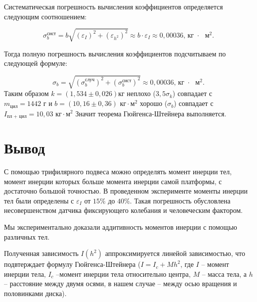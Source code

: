 \documentclass[a4paper,14pt]{extarticle}
\begin{document}
	Систематическая погрешность вычисления коэффициентов определяется следующим соотношением:
	
	\begin{equation}
		\sigma^\text{сист}_b = b\sqrt{\left( \varepsilon_{I} \right)^2 + \left( \varepsilon_{h^2} \right)^2 } \approx b \cdot \varepsilon_I \approx 0,00036 \text{,  кг $\cdot$ $\text{м}^2$}.
	\end{equation}
	
	Тогда полную погрешность вычисления коэффициентов подсчитываем по следующей формуле:
	
	\begin{equation}
		\sigma_b = \sqrt{\left( \sigma_b^\text{случ} \right)^2 + \left( \sigma_b^\text{сист} \right)^2 } \approx 0,00036 \text{,  кг $\cdot$ $\text{м}^2$}.
	\end{equation}
	Таким образом $k = (1,534 \pm 0,026)\text{кг}$ неплохо ($3,5\sigma_k$) совпадает с $m_\text{цил} = 1442 \text{ г}$ и $b = (10,16 \pm 0,36)\text{ кг} \cdot \text{м}^2$ хорошо ($\sigma_b$) совпадает с $I_\text{пл + цил} = 10,03\text{ кг} \cdot \text{м}^2 $
	Значит теорема Гюйгенса-Штейнера выполняется.
	\section{Вывод}
	
	С помощью трифилярного подвеса можно определять момент инерции тел, момент инерции которых больше момента инерции самой платформы, с достаточно большой точностью. В проведенном эксперименте моменты инерции тел были определены с $\varepsilon_I$ от $15\%$ до $40\%$. Такая погрешность обусловлена несовершенством датчика фиксирующего колебания и человеческим фактором.
	
	Мы экспериментально доказали аддитивность моментов инерции с помощью различных тел.
	
	Полученная зависимость $I(h^2)$ аппроксимируется линейой зависимостью, что подвтерждает формулу Гюйгенса-Штейнера ($I = I_c + Mh^2$, где $I$ -- момент инерции тела, $I_c$ --момент инерции тела относительно центра, $M$ -- масса тела, а $h$ -- расстояние между двумя осями, в нашем случае -- между осью вращения и половинками диска).
	
\end{document}
